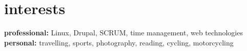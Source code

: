 \documentclass[]{friggeri-cv} %
\begin{document}


\section{interests}

\textbf{professional:} Linux, Drupal, SCRUM, time management, web technologies \\
\textbf{personal:} travelling, sports, photography, reading, cycling, motorcycling








\end{document}

